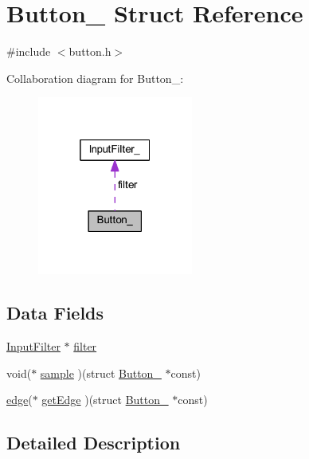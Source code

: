 \hypertarget{struct_button__}{}\section{Button\+\_\+ Struct Reference}
\label{struct_button__}


{\ttfamily \#include $<$button.\+h$>$}



Collaboration diagram for Button\+\_\+\+:\nopagebreak
\begin{figure}[H]
\begin{center}
\leavevmode
\includegraphics[width=145pt]{struct_button____coll__graph}
\end{center}
\end{figure}
\subsection*{Data Fields}
\begin{DoxyCompactItemize}
\item 
\mbox{\hyperlink{button_8h_aa0f38bbf6320aea7cc99c3a77ed46d80}{Input\+Filter}} $\ast$ \mbox{\hyperlink{struct_button___a9568e563650fcb16283e6df6008722e9}{filter}}
\item 
void($\ast$ \mbox{\hyperlink{struct_button___a54894037c0b758948b3d4d4ac39c2c0c}{sample}} )(struct \mbox{\hyperlink{struct_button__}{Button\+\_\+}} $\ast$const)
\item 
\mbox{\hyperlink{button_8h_a4ef43ff5c6d42dacbc8ffd9c8cfdc189}{edge}}($\ast$ \mbox{\hyperlink{struct_button___a164ee133b5e4233ebd6a6849f806f551}{get\+Edge}} )(struct \mbox{\hyperlink{struct_button__}{Button\+\_\+}} $\ast$const)
\end{DoxyCompactItemize}


\subsection{Detailed Description}


